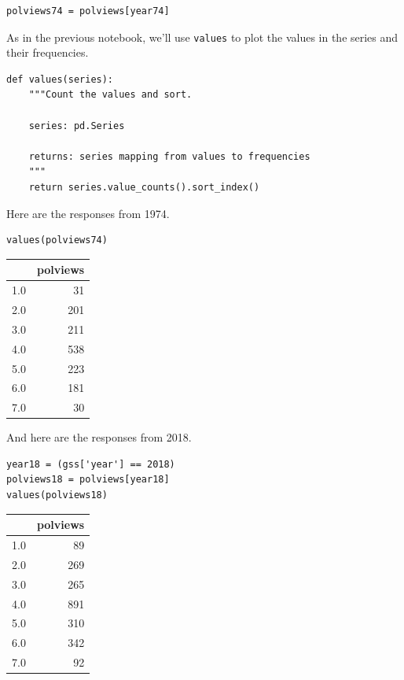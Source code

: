 \begin{lstlisting}[]
polviews74 = polviews[year74]
\end{lstlisting}

As in the previous notebook, we'll use \passthrough{\lstinline!values!}
to plot the values in the series and their frequencies.

\begin{lstlisting}[]
def values(series):
    """Count the values and sort.
    
    series: pd.Series
    
    returns: series mapping from values to frequencies
    """
    return series.value_counts().sort_index()
\end{lstlisting}

Here are the responses from 1974.

\begin{lstlisting}[]
values(polviews74)
\end{lstlisting}

\begin{tabular}{lr}
\midrule
{} &  polviews \\
\midrule
1.0 &        31 \\
2.0 &       201 \\
3.0 &       211 \\
4.0 &       538 \\
5.0 &       223 \\
6.0 &       181 \\
7.0 &        30 \\
\midrule
\end{tabular}

And here are the responses from 2018.

\begin{lstlisting}[]
year18 = (gss['year'] == 2018)
polviews18 = polviews[year18]
values(polviews18)
\end{lstlisting}

\begin{tabular}{lr}
\midrule
{} &  polviews \\
\midrule
1.0 &        89 \\
2.0 &       269 \\
3.0 &       265 \\
4.0 &       891 \\
5.0 &       310 \\
6.0 &       342 \\
7.0 &        92 \\
\midrule
\end{tabular}

